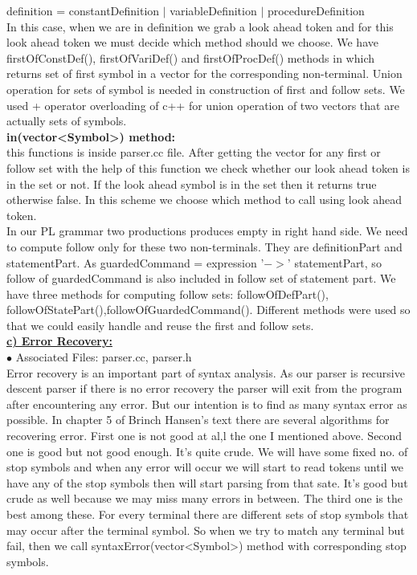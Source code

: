 \documentclass[paper=letter, fontsize=12pt]{scrartcl} %
\begin{document}
definition = constantDefinition $\mid$ variableDefinition $\mid$ procedureDefinition\\

In this case, when we are in definition we grab a look ahead token and for this look ahead token we must decide which method should we choose. We have firstOfConstDef(), firstOfVariDef() and firstOfProcDef() methods in which returns set of first symbol in a vector for the corresponding non-terminal. Union operation for sets of symbol is needed in construction of first and follow sets. We used + operator overloading of c++ for union operation of two vectors that are actually sets of symbols.\\ 

{\bf in(vector<Symbol>) method:}\\ this functions is inside parser.cc file. After getting the vector for any first or follow set with the help of this function we check whether our look ahead token is in the set or not. If the look ahead symbol is in the set then it returns true otherwise false. In this scheme we choose which method to call using look ahead token.\\

In our PL grammar two productions produces empty in right hand side. We need to compute follow only for these two non-terminals. They are definitionPart and statementPart. As guardedCommand = expression '$->$' statementPart, so follow of guardedCommand is also included in follow set of statement part. We have three methods for computing follow sets:  followOfDefPart(), followOfStatePart(),followOfGuardedCommand().  Different methods were used so that we could easily handle and reuse the first and follow sets.\\

\pagebreak
\underline {\bf c) Error Recovery:}\\
$\bullet$ Associated Files: parser.cc, parser.h\\ 

Error recovery is an important part of syntax analysis. As our parser is recursive descent parser if there is no error recovery the parser will exit from the program after encountering any error. But our intention is to find as many syntax error as possible. In chapter 5 of Brinch Hansen's text there are several algorithms for recovering error. First one is not good at al,l the one I mentioned above. Second one is good but not good enough. It's quite crude. We will have some fixed no. of stop symbols and when any error will occur we will start to read tokens until we have any of the stop symbols then will start parsing from that sate. It's good but crude as well because we may miss many errors in between. The third one is the best among these. For every terminal there are different sets of stop symbols that may occur after the terminal symbol. So when we try to match any terminal but fail, then we call syntaxError(vector<Symbol>) method with corresponding stop symbols.\\
\end{document}

